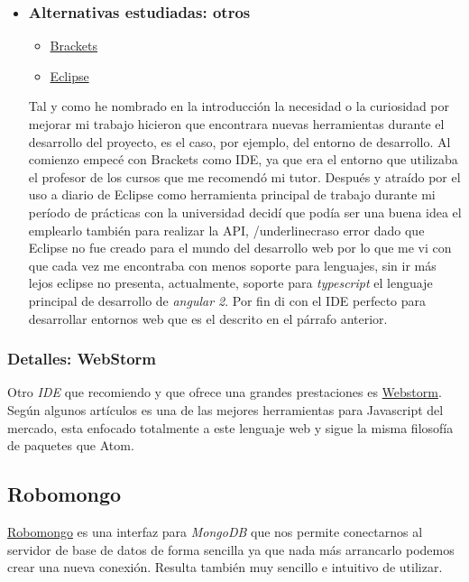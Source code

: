 \begin{itemize}
	\item \subsubsection{Alternativas estudiadas: otros}
	\begin{itemize}
		\item \hyperlink{http://brackets.io/}{Brackets}
		\item \hyperlink{http://eclipse.org}{Eclipse}
	\end{itemize}
	Tal y como he nombrado en la introducción la necesidad o la curiosidad por mejorar mi trabajo hicieron que encontrara nuevas herramientas durante el desarrollo del proyecto, es el caso, por ejemplo, del entorno de desarrollo. Al comienzo empecé con Brackets como IDE, ya que era el entorno que utilizaba el profesor de los cursos que me recomendó  mi tutor. Después y atraído por el uso a diario de Eclipse como herramienta principal de trabajo durante mi período de prácticas con la universidad decidí que podía ser una buena idea el emplearlo también para realizar la API, /underline{craso error} dado que Eclipse no fue creado para el mundo del desarrollo web por lo que me vi con que cada vez me encontraba con menos soporte para lenguajes, sin ir más lejos eclipse no presenta, actualmente, soporte para  \emph{typescript} el lenguaje principal de desarrollo de  \emph{angular 2}. Por fin di con el IDE perfecto para desarrollar entornos web que es el descrito en el párrafo anterior.
\end{itemize}

\subsubsection{Detalles: WebStorm}\label{detalle_webstorm}
Otro \emph{IDE} que recomiendo y que ofrece una grandes prestaciones es \hyperlink{https://www.jetbrains.com/webstorm/}{Webstorm}. Según algunos artículos \cite{articulo1} es una de las mejores herramientas para Javascript del mercado, esta enfocado totalmente a este lenguaje web y sigue la misma filosofía de paquetes que Atom. 


\subsection{Robomongo}\label{herramientas_robomongo}
\hyperlink{http://http//robomongo.org/}{Robomongo} es una interfaz para \emph{MongoDB} que nos permite conectarnos al servidor de base de datos de forma sencilla ya que nada más arrancarlo podemos crear una nueva conexión. Resulta también muy sencillo e intuitivo de utilizar.



